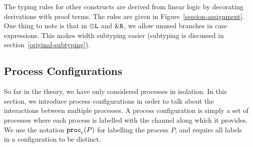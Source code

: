 \documentclass[a4paper,USenglish]{lipics-v2016}
\begin{document}
The typing rules for other constructs are derived from linear logic by decorating derivations with proof terms. The rules are given in Figure~\ref{session-assignment}. One thing to note is that in $\oplus\texttt{L}$ and $\&\texttt{R}$, we allow unused branches in case expressions. This makes width subtyping easier (subtyping is discussed in section~\ref{original-subtyping}).



\subsection{Process Configurations}

So far in the theory, we have only considered processes in isolation. In this section, we introduce process configurations in order to talk about the interactions between multiple processes. A process configuration is simply a set of processes where each process is labelled with the channel along which it provides. We use the notation $\mathtt{proc}_{c}(P)$ for labelling the process $P$, and require all labels in a configuration to be distinct.
\end{document}
